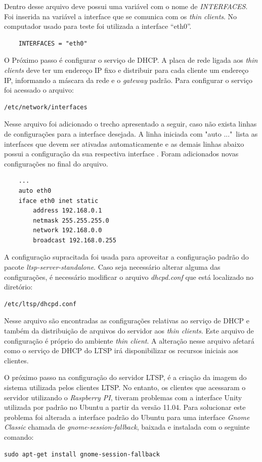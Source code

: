 \documentclass[
	12pt,				%
	openright,			%
	twoside,			%
	a4paper,			%
	chapter=TITLE,		%
	english,			%
	brazil				%
	]{abntex2}
\begin{document}
Dentro desse arquivo deve possui uma variável com o nome de \textit{INTERFACES}. Foi inserida na variável a interface que se comunica com os \textit{thin clients}. No computador usado para teste foi utilizada a interface “eth0”.
\begin{verbatim}
	INTERFACES = "eth0"
\end{verbatim}

O Próximo passo é configurar o serviço de DHCP. A placa de rede ligada aos \textit{thin clients} deve ter um endereço IP fixo e distribuir para cada cliente um endereço IP, informando a máscara da rede e o \textit{gateway} padrão. Para configurar o serviço foi acessado o arquivo: 
\begin{verbatim}
/etc/network/interfaces
\end{verbatim} 

Nesse arquivo foi adicionado o trecho apresentado a seguir, caso não exista linhas de configurações para a interface desejada. A linha iniciada com "auto ..."\ lista as interfaces que devem ser ativadas automaticamente e as demais linhas abaixo possui a configuração da sua respectiva interface \cite{ClubeHardware,LTSP5}. Foram adicionados novas configurações no final do arquivo. 
\begin{verbatim}
	...
	auto eth0  
	iface eth0 inet static
		address 192.168.0.1
		netmask 255.255.255.0
		network 192.168.0.0
		broadcast 192.168.0.255
\end{verbatim}

A configuração supracitada foi usada para aproveitar a configuração padrão  do pacote \textit{ltsp-server-standalone}. Caso seja necessário alterar alguma das configurações, é necessário modificar o arquivo \textit{dhcpd.conf} que está localizado no diretório:
\begin{verbatim}
/etc/ltsp/dhcpd.conf
\end{verbatim}

Nesse arquivo são encontradas as configurações relativas ao serviço de DHCP e também da distribuição de arquivos do servidor aos \textit{thin clients}. Este arquivo de configuração é próprio do ambiente \textit{thin client}. A alteração nesse arquivo afetará como o  serviço de DHCP do LTSP irá disponibilizar os recursos iniciais aos clientes.

O próximo passo na configuração do servidor LTSP, é a criação da imagem do sistema utilizada pelos clientes LTSP. No entanto, os clientes que acessaram o servidor utilizando o \textit{Raspberry PI}, tiveram problemas com a interface Unity utilizada por padrão no Ubuntu a partir da versão 11.04. Para solucionar este problema foi alterada a interface padrão do Ubuntu para uma interface \textit{Gnome Classic} chamada de \textit{gnome-session-fallback}, baixada e instalada com o seguinte comando:
\begin{verbatim}
sudo apt-get install gnome-session-fallback
\end{verbatim}
\end{document}
